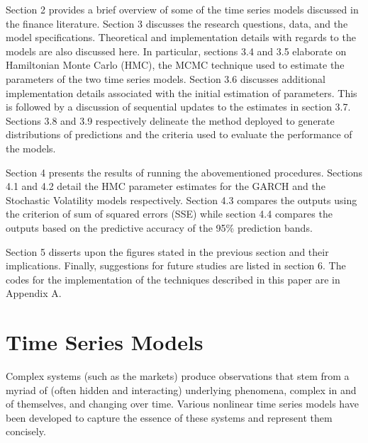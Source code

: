 \documentclass[12pt,letterpaper,reqno,fleqn]{article}
\begin{document}
Section 2 provides a brief overview of some of the time series models discussed in the finance literature. Section 3 discusses the research questions, data, and the model specifications. Theoretical and implementation details with regards to the models are also discussed here. In particular, sections 3.4 and 3.5 elaborate on Hamiltonian Monte Carlo (HMC), the MCMC technique used to estimate the parameters of the two time series models. Section 3.6 discusses additional implementation details associated with the initial estimation of parameters. This is followed by a discussion of sequential updates to the estimates in section 3.7. Sections 3.8 and 3.9 respectively delineate the method deployed to generate distributions of predictions and the criteria used to evaluate the performance of the models.

Section 4 presents the results of running the abovementioned procedures. Sections 4.1 and 4.2 detail the HMC parameter estimates for the GARCH and the Stochastic Volatility models respectively. Section 4.3 compares the outputs using the criterion of sum of squared errors (SSE) while section 4.4 compares the outputs based on the predictive accuracy of the 95\% prediction bands. 

Section 5 disserts upon the figures stated in the previous section and their implications. Finally, suggestions for future studies are listed in section 6. The codes for the implementation of the techniques described in this paper are in Appendix A.

\newpage

\section{Time Series Models} 
Complex systems (such as the markets) produce observations that stem from a myriad of (often hidden and interacting) underlying phenomena, complex in and of themselves, and changing over time. Various nonlinear time series models have been developed to capture the essence of these systems and represent them concisely.  
\end{document}
